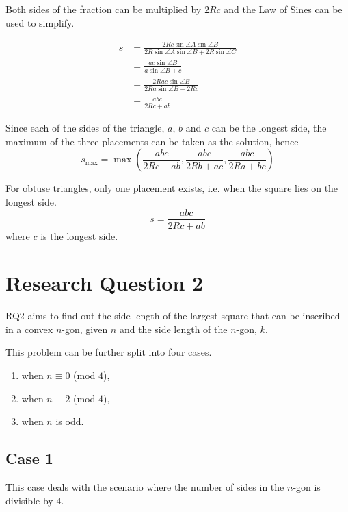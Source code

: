 \documentclass[12pt]{scrartcl}
\begin{document}
Both sides of the fraction can be multiplied by $2Rc$ and the Law of Sines can be used to simplify.

\begin{align*}
	 s & = \frac{2Rc\sin\angle{A}\sin\angle{B}}{2R\sin\angle{A}\sin \angle{B}+2R\sin \angle C}                                  \\
	  & = \frac{ac\sin\angle{B}}{a\sin\angle{B}+c}                                                                             \\
	  & = \frac{2Rac\sin\angle{B}}{2Ra\sin\angle{B}+2Rc}                                                                       \\
	  & = \frac{abc}{2Rc+ab}
\end{align*}

Since each of the sides of the triangle, $a$, $b$ and $c$ can be the longest side,
the maximum of the three placements can be taken as the solution, hence
\begin{equation}
	s_{\text{max}} = \max\left(\dfrac{abc}{2Rc+ab},\dfrac{abc}{2Rb+ac},\dfrac{abc}{2Ra+bc}\right)
\end{equation}

For obtuse triangles, only one placement exists, i.e. when the square lies on the longest side.
\begin{equation}
	s = \dfrac{abc}{2Rc+ab}
\end{equation}
where $c$ is the longest side.

\pagebreak

\section{Research Question 2}

RQ2 aims to find out the side length of the largest square that can be inscribed in a convex $n$-gon,
given $n$ and the side length of the $n$-gon, $k$.

This problem can be further split into four cases.
\begin{enumerate}
	\item when \(n \equiv 0\) (mod $4$),
	\item when \(n \equiv 2\) (mod $4$),
	\item when $n$ is odd.
\end{enumerate}

\subsection{Case 1}
This case deals with the scenario where the number of sides in the $n$-gon is divisible by $4$.
\end{document}
